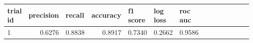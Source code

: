 \begin{tabular}{llllllllllllll}
    \toprule

    \textbf{trial id} &
    \textbf{precision} &
    \textbf{recall} &
    \textbf{accuracy} &
    \textbf{f1 score} &
    \textbf{log loss} &
    \textbf{roc auc} \\
    \midrule

    \multicolumn{1}{l}{1} &
    \multicolumn{1}{r}{0.6276} &
    \multicolumn{1}{r}{0.8838} &
    \multicolumn{1}{r}{0.8917} &
    \multicolumn{1}{r}{0.7340} &
    \multicolumn{1}{r}{0.2662} &
    \multicolumn{1}{r}{0.9586} \\
    \bottomrule

\end{tabular}
